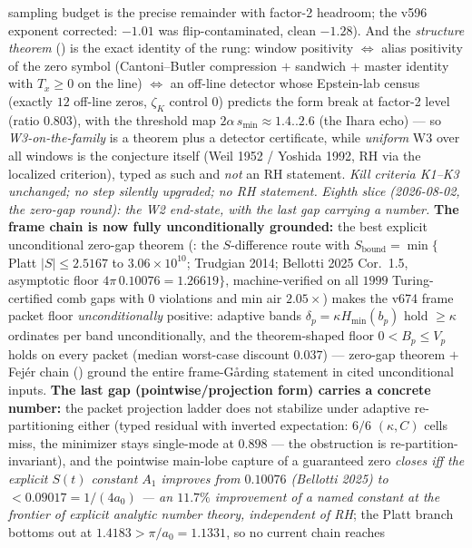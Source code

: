 sampling budget is the precise remainder with factor-2 headroom;
the v596 exponent corrected: $-1.01$ was flip-contaminated, clean
$-1.28$).  And the \emph{structure theorem}
() is the exact identity of
the rung: window positivity $\Leftrightarrow$ alias positivity of
the zero symbol (Cantoni--Butler compression $+$ sandwich $+$
master identity with $T_x\ge0$ on the line) $\Leftrightarrow$ an
off-line detector whose Epstein-lab census (exactly $12$ off-line
zeros, $\zeta_K$ control $0$) predicts the form break at factor-2
level (ratio $0.803$), with the threshold map
$2\alpha\,s_{\min}\approx1.4..2.6$ (the Ihara echo) --- so
\emph{W3-on-the-family} is a theorem plus a detector certificate,
while \emph{uniform} W3 over all windows is the conjecture itself
(Weil 1952 / Yoshida 1992, RH via the localized criterion), typed
as such and \emph{not} an RH statement.  \emph{Kill criteria K1--K3
unchanged; no step silently upgraded; no RH statement.}
\emph{Eighth slice (2026-08-02, the zero-gap round): the W2
end-state, with the last gap carrying a number.}  \textbf{The frame
chain is now fully unconditionally grounded:} the best explicit
unconditional zero-gap theorem (:
the $S$-difference route with $S_{\mathrm{bound}}=\min\{$Platt
$|S|\le2.5167$ to $3.06\times10^{10}$; Trudgian 2014; Bellotti 2025
Cor.~1.5, asymptotic floor $4\pi\,0.10076=1.26619\}$,
machine-verified on all $1999$ Turing-certified comb gaps with $0$
violations and min air $2.05\times$) makes the v674 frame packet
floor \emph{unconditionally} positive: adaptive bands
$\delta_p=\kappa H_{\min}(b_p)$ hold $\ge\kappa$ ordinates per band
unconditionally, and the theorem-shaped floor $0<B_p\le V_p$ holds on
every packet (median worst-case discount $0.037$) --- zero-gap
theorem $+$ Fej\'er chain () ground the
entire frame-G\aa rding statement in cited unconditional inputs.
\textbf{The last gap (pointwise/projection form) carries a concrete
number:} the packet projection ladder does not stabilize under
adaptive re-partitioning either (typed residual with inverted
expectation: $6/6$ $(\kappa,C)$ cells miss, the minimizer stays
single-mode at $0.898$ --- the obstruction is
re-partition-invariant), and the pointwise main-lobe capture of a
guaranteed zero \emph{closes iff the explicit $S(t)$ constant $A_1$
improves from $0.10076$ (Bellotti 2025) to $<0.09017=1/(4a_0)$
--- an $11.7\%$ improvement of a named constant at the frontier of
explicit analytic number theory, independent of RH}; the Platt branch
bottoms out at $1.4183>\pi/a_0=1.1331$, so no current chain reaches

